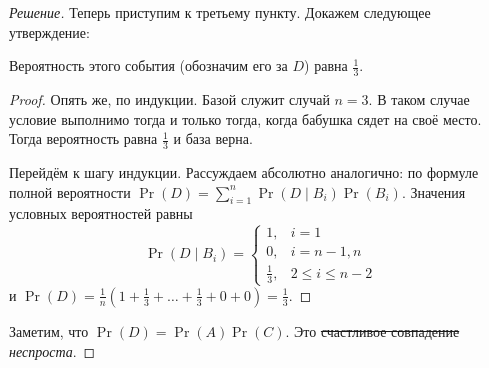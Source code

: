 \begin{proof}[Решение]
    Теперь приступим к третьему пункту. Докажем следующее утверждение:
    \begin{hypothesis}
        Вероятность этого события (обозначим его за \(D\)) равна \(\frac{1}{3}\).
    \end{hypothesis}
    \begin{proof}
        Опять же, по индукции. Базой служит случай \(n = 3\). В таком случае условие выполнимо тогда и только тогда, когда бабушка сядет на своё место. Тогда вероятность равна \(\frac{1}{3}\) и база верна.
        
        Перейдём к шагу индукции. Рассуждаем абсолютно аналогично: по формуле полной вероятности \(\Pr(D) = \sum\limits_{i = 1}^{n} \Pr(D \mid B_i)\Pr(B_i)\). Значения условных вероятностей равны
        \[\Pr(D \mid B_i) = \begin{cases}
        1, & i = 1 \\
        0, & i = n - 1, n \\
        \frac{1}{3}, & 2 \leq i \leq n - 2
        \end{cases}\]
        и \(\Pr(D) = \frac{1}{n}\left(1 + \frac{1}{3} + \ldots + \frac{1}{3} + 0 + 0\right) = \frac{1}{3}\).
    \end{proof}
    Заметим, что \(\Pr(D) = \Pr(A)\Pr(C)\). Это \sout{счастливое совпадение} \emph{неспроста}.
\end{proof}

